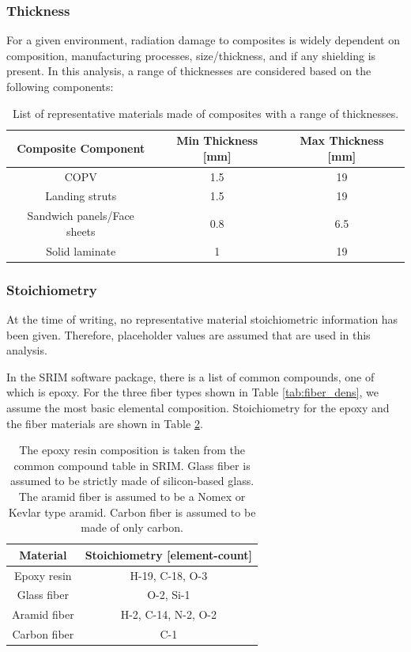 \documentclass{hitec}
\begin{document}
\subsubsection{Thickness}
For a given environment, radiation damage to composites is widely dependent on composition, manufacturing processes, size/thickness, and if any shielding is present. In this analysis, a range of thicknesses are considered based on the following components:

\begin{table}[h]\centering
	\caption{List of representative materials made of composites with a range of thicknesses.}\label{tab:thickness_comp}
	\begin{tabular}{|c | c | c |}\hline
		Composite Component & Min Thickness [mm] & Max Thickness [mm] \\\hline
		COPV & 1.5 & 19 \\\hline
		Landing struts	& 1.5 & 19 \\\hline
		Sandwich panels/Face sheets	& 0.8 & 6.5 \\\hline
		Solid laminate	& 1 & 19 \\\hline	
	\end{tabular}
\end{table}

\subsubsection{Stoichiometry}

At the time of writing, no representative material stoichiometric information has been given. Therefore, placeholder values are assumed that are used in this analysis.

In the SRIM software package, there is a list of common compounds, one of which is epoxy. For the three fiber types shown in Table \ref{tab:fiber_dens}, we assume the most basic elemental composition. Stoichiometry for the epoxy and the fiber materials are shown in Table \ref{tab:stoichiometry}.

\begin{table}[h]\centering
	\caption{The epoxy resin composition is taken from the common compound table in SRIM. Glass fiber is assumed to be strictly made of silicon-based glass. The aramid fiber is assumed to be a Nomex or Kevlar type aramid. Carbon fiber is assumed to be made of only carbon.}\label{tab:stoichiometry}
	\begin{tabular}{|c | c |}\hline
		Material & Stoichiometry [element-count] \\\hline
		Epoxy resin & H-19, C-18, O-3 \\\hline
		Glass fiber & O-2, Si-1 \\\hline
		Aramid fiber & H-2, C-14, N-2, O-2  \\\hline
		Carbon fiber & C-1  \\\hline	
	\end{tabular}
\end{table}
\end{document}
